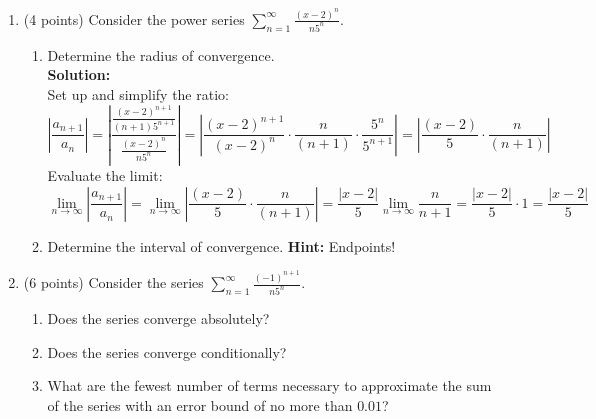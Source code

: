 \documentclass[paper=a4, fontsize=11pt]{scrartcl} %
\numberwithin{equation}{section} %
\numberwithin{figure}{section} %
\numberwithin{table}{section} %
\begin{document}
\begin{enumerate}
\item (4 points) Consider the power series $\sum\limits_{n=1}^\infty \frac{(x-2)^n}{n5^n}$.
\begin{enumerate}
\item Determine the radius of convergence.\\
\noindent\textbf{Solution:}\\
Set up and simplify the ratio:
\begin{equation*}
| \frac{a_{n+1}}{a_n} | = | \frac{\frac{(x-2)^{n+1}}{(n+1)5^{n+1}}}{\frac{(x-2)^n}{n5^n}} | = | \frac{(x-2)^{n+1}}{(x-2)^n} \cdot \frac{n}{(n+1)} \cdot \frac{5^n}{5^{n+1}} | = |\frac{(x-2)}{5} \cdot \frac{n}{(n+1)}|
\end{equation*}
Evaluate the limit:
\begin{equation*}
\lim\limits_{n \rightarrow \infty}| \frac{a_{n+1}}{a_n} | =\lim\limits_{n \rightarrow \infty} |\frac{(x-2)}{5} \cdot \frac{n}{(n+1)}| = \frac{|x-2|}{5}  \lim\limits_{n \rightarrow \infty} \frac{n}{n+1} = \frac{|x-2|}{5} \cdot 1 =\frac{|x-2|}{5}
\end{equation*}
 \vspace{.5in}
\item Determine the interval of convergence. \textbf{Hint:} Endpoints!
\end{enumerate}

\newpage

\item (6 points) Consider the series $\sum\limits_{n=1}^\infty \frac{(-1)^{n+1}}{n5^n}$.
\begin{enumerate}
\item Does the series converge absolutely?
 \vspace{2in}
\item Does the series converge conditionally?
 \vspace{3in}
\item What are the fewest number of terms necessary to approximate the sum of the series with an error bound of no more than $0.01$?
\end{enumerate}

\end{enumerate}

\end{document}
